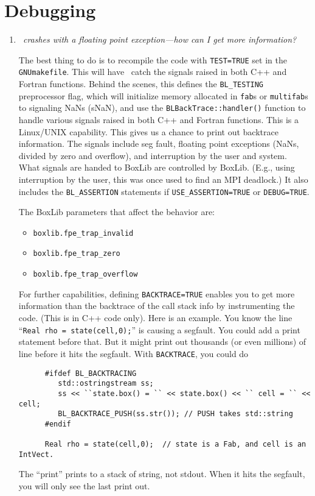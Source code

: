 \section{Debugging}

\begin{enumerate}

\item {\em \castro\ crashes with a floating point exception---how can
  I get more information?}

  The best thing to do is to recompile the code with {\tt TEST=TRUE}
  set in the {\tt GNUmakefile}.  This will have \boxlib\ catch the
  signals raised in both C++ and Fortran functions.  Behind the
  scenes, this defines the {\tt BL\_TESTING} preprocessor flag, which
  will initialize memory allocated in {\tt fab}s or {\tt multifab}s to
  signaling NaNs (sNaN), and use the {\tt BLBackTrace::handler()}
  function to handle various signals raised in both C++ and Fortran
  functions.  This is a Linux/UNIX capability.  This gives us a chance
  to print out backtrace information.  The signals include seg fault,
  floating point exceptions (NaNs, divided by zero and overflow), and
  interruption by the user and system.  What signals are handed to
  BoxLib are controlled by BoxLib.  (E.g., using interruption by the
  user, this was once used to find an MPI deadlock.)  It also includes
  the {\tt BL\_ASSERTION} statements if {\tt USE\_ASSERTION=TRUE} or
  {\tt DEBUG=TRUE}. 

  The BoxLib parameters that affect the behavior are:
  \begin{itemize}
    \item {\tt boxlib.fpe\_trap\_invalid}
    \item {\tt boxlib.fpe\_trap\_zero}
    \item {\tt boxlib.fpe\_trap\_overflow}
  \end{itemize}

  For further capabilities, defining {\tt BACKTRACE=TRUE} enables you
  to get more information than the backtrace of the call stack info by
  instrumenting the code.  (This is in C++ code only). Here is an
  example.  You know the line ``{\tt Real rho = state(cell,0);}'' is
  causing a segfault.  You could add a print statement before that.
  But it might print out thousands (or even millions) of line before
  it hits the segfault.  With {\tt BACKTRACE}, you could do

\begin{verbatim}
      #ifdef BL_BACKTRACING
         std::ostringstream ss;
         ss << ``state.box() = `` << state.box() << `` cell = `` << cell;
         BL_BACKTRACE_PUSH(ss.str()); // PUSH takes std::string
      #endif

      Real rho = state(cell,0);  // state is a Fab, and cell is an IntVect.
    \end{verbatim}

    The ``print'' prints to a stack of string, not stdout.  When it
    hits the segfault, you will only see the last print out.



\end{enumerate}
